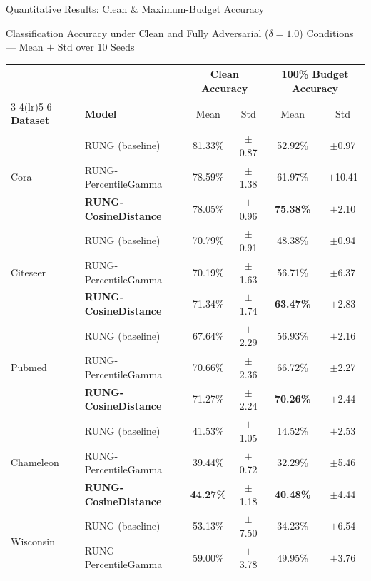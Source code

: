 \documentclass[aspectratio=169]{beamer}
\begin{document}
\begin{frame}{Quantitative Results: Clean \& Maximum-Budget Accuracy}
  \tiny
  \begin{block}{\tiny Classification Accuracy under Clean and Fully Adversarial ($\delta = 1.0$) Conditions --- Mean $\pm$ Std over 10 Seeds}
    \tiny
    \begin{tabular}{llcccc}
      \toprule
      & & \multicolumn{2}{c}{\textbf{Clean Accuracy}} & \multicolumn{2}{c}{\textbf{100\% Budget Accuracy}} \\
      \cmidrule(lr){3-4}\cmidrule(lr){5-6}
      \textbf{Dataset} & \textbf{Model} & Mean & Std & Mean & Std \\
      \midrule
      \multirow{3}{*}{Cora}
        & RUNG (baseline)        & 81.33\% & $\pm$0.87 & 52.92\% & $\pm$0.97 \\
        & RUNG-PercentileGamma   & 78.59\% & $\pm$1.38 & 61.97\% & $\pm$10.41 \\
        & \textbf{RUNG-CosineDistance} & 78.05\% & $\pm$0.96 & \textbf{75.38\%} & $\pm$2.10 \\
      \midrule
      \multirow{3}{*}{Citeseer}
        & RUNG (baseline)        & 70.79\% & $\pm$0.91 & 48.38\% & $\pm$0.94 \\
        & RUNG-PercentileGamma   & 70.19\% & $\pm$1.63 & 56.71\% & $\pm$6.37 \\
        & \textbf{RUNG-CosineDistance} & 71.34\% & $\pm$1.74 & \textbf{63.47\%} & $\pm$2.83 \\
      \midrule
      \multirow{3}{*}{Pubmed}
        & RUNG (baseline)        & 67.64\% & $\pm$2.29 & 56.93\% & $\pm$2.16 \\
        & RUNG-PercentileGamma   & 70.66\% & $\pm$2.36 & 66.72\% & $\pm$2.27 \\
        & \textbf{RUNG-CosineDistance} & 71.27\% & $\pm$2.24 & \textbf{70.26\%} & $\pm$2.44 \\
      \midrule
      \multirow{3}{*}{Chameleon}
        & RUNG (baseline)        & 41.53\% & $\pm$1.05 & 14.52\% & $\pm$2.53 \\
        & RUNG-PercentileGamma   & 39.44\% & $\pm$0.72 & 32.29\% & $\pm$5.46 \\
        & \textbf{RUNG-CosineDistance} & \textbf{44.27\%} & $\pm$1.18 & \textbf{40.48\%} & $\pm$4.44 \\
      \midrule
      \multirow{3}{*}{Wisconsin}
        & RUNG (baseline)        & 53.13\% & $\pm$7.50 & 34.23\% & $\pm$6.54 \\
        & RUNG-PercentileGamma   & 59.00\% & $\pm$3.78 & 49.95\% & $\pm$3.76 \\

\end{tabular}
\end{block}
\end{frame}
\end{document}
